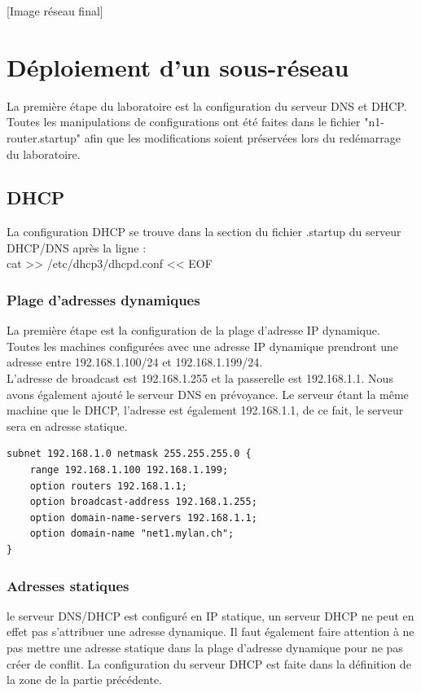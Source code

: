 \documentclass{article}
\begin{document}
[Image réseau final]

\clearpage

\section{Déploiement d'un sous-réseau}
La première étape du laboratoire est la configuration du serveur DNS et DHCP. Toutes les manipulations de configurations ont été faites dans le fichier "n1-router.startup" afin que les modifications soient préservées lors du redémarrage du laboratoire.

\subsection{DHCP}
La configuration DHCP se trouve dans la section du fichier .startup du serveur DHCP/DNS après la ligne : \\

cat >> /etc/dhcp3/dhcpd.conf << EOF

\subsubsection{Plage d'adresses dynamiques}
La première étape est la configuration de la plage d'adresse IP dynamique. Toutes les machines configurées avec une adresse IP dynamique prendront une adresse entre 192.168.1.100/24 et 192.168.1.199/24.\\

L'adresse de broadcast est 192.168.1.255 et la passerelle est 192.168.1.1. Nous avons également ajouté le serveur DNS en prévoyance. Le serveur étant la même machine que le DHCP, l'adresse est également 192.168.1.1, de ce fait, le serveur sera en adresse statique.\\

\begin{lstlisting}
subnet 192.168.1.0 netmask 255.255.255.0 {
	range 192.168.1.100 192.168.1.199;
	option routers 192.168.1.1;
	option broadcast-address 192.168.1.255;
	option domain-name-servers 192.168.1.1;
	option domain-name "net1.mylan.ch";
}
\end{lstlisting}


\subsubsection{Adresses statiques}
le serveur DNS/DHCP est configuré en IP statique, un serveur DHCP ne peut en effet pas s'attribuer une adresse dynamique. Il faut également faire attention à ne pas mettre une adresse statique dans la plage d'adresse dynamique pour ne pas créer de conflit. La configuration du serveur DHCP est faite dans la définition de la zone de la partie précédente.\\
\end{document}
